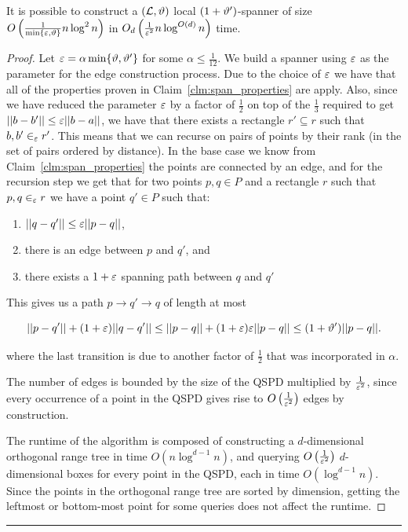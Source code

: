 \documentclass[12pt]{article}%
\begin{document}
    \begin{claim}
	It is possible to construct a $(\mathcal{L}, \vartheta)$ local
        $(1+\vartheta')$-spanner of size
        $O\left(\frac{1}{\min\{\varepsilon, \vartheta\}}n\log^2n\right)$ in
        $O_d\left(\frac{1}{\varepsilon^2}n\log^{O(d)}n\right)$ time.
    \end{claim}

\begin{proof} 
    Let $\varepsilon = \alpha \min \{\vartheta,\vartheta'\}$ for some
    $\alpha \leq \frac{1}{12}$. We build a spanner using $\varepsilon$ as the
    parameter for the edge construction process. Due to the choice of
    $\varepsilon$ we have that all of the properties proven in
    Claim~\ref{clm:span_properties} are apply. Also, since we have
    reduced the parameter $\varepsilon$ by a factor of $\frac{1}{2}$ on top
    of the $\frac{1}{3}$ required to get $||b-b'||\leq \varepsilon ||b-a||$,
    we have that there exists a rectangle $r'\subseteq r$ such that
    $b,b'\in_{\varepsilon}r'$. This means that we can recurse on pairs of
    points by their rank (in the set of pairs ordered by distance). In
    the base case we know from Claim~\ref{clm:span_properties} the
    points are connected by an edge, and for the recursion step we get
    that for two points $p,q\in P$ and a rectangle $r$ such that
    $p,q\in_{\varepsilon} r$ we have a point $q'\in P$ such that:
    \begin{enumerate}
        \item $||q-q'||\leq \varepsilon||p-q||$,
        \item there is an edge between $p$ and $q'$, and
        \item there exists a $1+\varepsilon$ spanning path between $q$ and
        $q'$
    \end{enumerate}

    This gives us a path $p\rightarrow q' \rightarrow q$ of length at
    most
	
	\begin{equation}
            ||p-q'||+(1+\varepsilon)||q-q'||\leq
            ||p-q||+(1+\varepsilon)\varepsilon||p-q||\leq (1+\vartheta')||p-q||.
        \end{equation}
	
	where the last transition is due to another factor of
        $\frac{1}{2}$ that was incorporated in $\alpha$.
	
	The number of edges is bounded by the size of the QSPD
        multiplied by $\frac{1}{\varepsilon^2}$, since every occurrence of a
        point in the QSPD gives rise to
        $O\left(\frac{1}{\varepsilon^2}\right)$ edges by construction.
	
	The runtime of the algorithm is composed of constructing a
        $d$-dimensional orthogonal range tree in time
        $O(n\log^{d-1}n)$, and querying
        $O\left(\frac{1}{\varepsilon^2}\right)$ $d$-dimensional boxes for
        every point in the QSPD, each in time $O(\log^{d-1}n)$. Since
        the points in the orthogonal range tree are sorted by
        dimension, getting the leftmost or bottom-most point for some
        queries does not affect the runtime.
	
\end{proof}
\hrule
\end{document}
